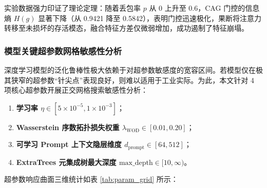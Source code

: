 实验数据强力印证了理论定理：随着丢包率 $p$ 从 0 上升至 0.6，CAG 门控的信息熵 $H(g)$ 显著下降（从 0.9421 降至 0.5842），表明门控迅速极化，果断将注意力转移至未损坏的存活模态，融合特征方差仅微弱增加，成功遏制了特征崩塌。

\clearpage

\subsubsection{模型关键超参数网格敏感性分析}
深度学习模型的泛化鲁棒性极大依赖于对超参数敏感度的宽容区间。若模型仅在极其狭窄的超参数“针尖点”表现良好，则难以适用于工业实际。为此，本文针对 4 项核心超参数开展正交网格搜索敏感性分析：
\begin{enumerate}
    \item \textbf{学习率 $\eta \in [5\times 10^{-5}, 1\times 10^{-3}]$}；
    \item \textbf{Wasserstein 序数拓扑损失权重 $\lambda_{\text{WOD}} \in [0.01, 0.20]$}；
    \item \textbf{可学习 Prompt 上下文隐层维度 $d_{\text{prompt}} \in [64, 512]$}；
    \item \textbf{ExtraTrees 元集成树最大深度 $\text{max\_depth} \in [10, \infty)$}。
\end{enumerate}

超参数响应曲面三维统计如表 \ref{tab:param_grid} 所示：

